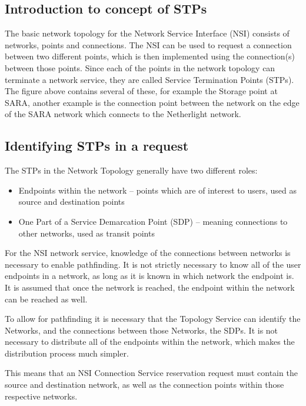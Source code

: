 \documentclass[12pt]{article}  %
\begin{document}
\subsection{Introduction to concept of STPs}

The basic network topology for the Network Service Interface (NSI) 
consists of networks, points and connections. The NSI can be used to request a 
connection between two different points, which is then implemented using the connection(s) 
between those points. Since each of the points in the network topology can terminate 
a network service, they are called Service Termination Points (STPs). The figure 
above contains several of these, for example the Storage point at SARA, another 
example is the connection point between the network on the edge of the SARA network 
which connects to the Netherlight network.


\subsection{Identifying STPs in a request}

The STPs in the Network Topology generally have two different 
roles:

\begin{itemize}
    \item  Endpoints within the network – points which are of interest to 
users, used as source and destination points

\item  One Part of a Service Demarcation Point (SDP) – meaning connections 
to other networks, used as transit points
\end{itemize}

For the NSI network service, knowledge of the connections between 
networks is necessary to enable pathfinding. It is not strictly necessary to know 
all of the user endpoints in a network, as long as it is known in which network 
the endpoint is. It is assumed that once the network is reached, the endpoint within 
the network can be reached as well.

To allow for pathfinding it is necessary that the Topology Service 
can identify the Networks, and the connections between those Networks, the SDPs. 
It is not necessary to distribute all of the endpoints within the network, which 
makes the distribution process much simpler.

This means that an NSI Connection Service reservation request must contain the source and destination 
network, as well as the connection points within those respective networks.
\end{document}
